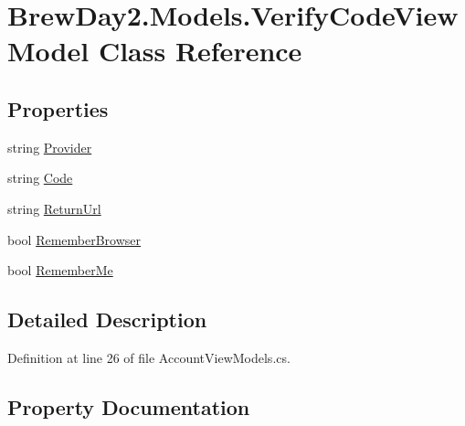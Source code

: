 \hypertarget{class_brew_day2_1_1_models_1_1_verify_code_view_model}{}\section{Brew\+Day2.\+Models.\+Verify\+Code\+View\+Model Class Reference}
\label{class_brew_day2_1_1_models_1_1_verify_code_view_model}
\subsection*{Properties}
\begin{DoxyCompactItemize}
\item 
string \mbox{\hyperlink{class_brew_day2_1_1_models_1_1_verify_code_view_model_a09f7b82a2b7b176d4ddf4db02b7705a2}{Provider}}
\item 
string \mbox{\hyperlink{class_brew_day2_1_1_models_1_1_verify_code_view_model_aa1a9a8002d54782f27806b96550b8f20}{Code}}
\item 
string \mbox{\hyperlink{class_brew_day2_1_1_models_1_1_verify_code_view_model_a2ff6662d603826e3ccf06f3912ec06b6}{Return\+Url}}
\item 
bool \mbox{\hyperlink{class_brew_day2_1_1_models_1_1_verify_code_view_model_acad0065bccb07e8016c7b62496700416}{Remember\+Browser}}
\item 
bool \mbox{\hyperlink{class_brew_day2_1_1_models_1_1_verify_code_view_model_ac7a475bd20366d27a165e698e8d0aab0}{Remember\+Me}}
\end{DoxyCompactItemize}


\subsection{Detailed Description}


Definition at line 26 of file Account\+View\+Models.\+cs.



\subsection{Property Documentation}
\mbox{\label{class_brew_day2_1_1_models_1_1_verify_code_view_model_aa1a9a8002d54782f27806b96550b8f20}} 
